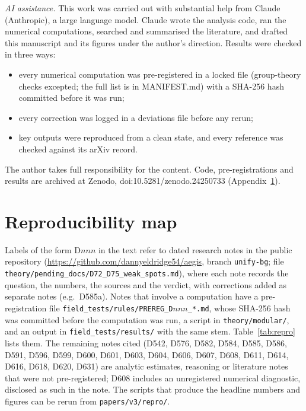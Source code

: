\documentclass[aps,prd,twocolumn,superscriptaddress,nofootinbib,floatfix]{revtex4-2}
\begin{document}
\begin{acknowledgments}
\textit{AI assistance.} This work was carried out with substantial help from Claude (Anthropic), a large language model. Claude wrote the analysis code, ran the numerical computations, searched and summarised the literature, and drafted this manuscript and its figures under the author's direction. Results were checked in three ways:
\begin{itemize}
\item every numerical computation was pre-registered in a locked file (group-theory checks excepted; the full list is in MANIFEST.md) with a SHA-256 hash committed before it was run;
\item every correction was logged in a deviations file before any rerun;
\item key outputs were reproduced from a clean state, and every reference was checked against its arXiv record.
\end{itemize}
The author takes full responsibility for the content. Code, pre-registrations and results are archived at Zenodo, doi:10.5281/zenodo.24250733 (Appendix~\ref{app:repro}).
\end{acknowledgments}

\appendix
\section{Reproducibility map}\label{app:repro}
Labels of the form D$nnn$ in the text refer to dated research notes in the public repository (\url{https://github.com/dannyeldridge54/aegis}, branch \texttt{unify-bg}; file \texttt{theory/pending\_docs/D72\_D75\_weak\_spots.md}), where each note records the question, the numbers, the sources and the verdict, with corrections added as separate notes (e.g.\ D585a). Notes that involve a computation have a pre-registration file \texttt{field\_tests/rules/PREREG\_D$nnn$\_*.md}, whose SHA-256 hash was committed before the computation was run, a script in \texttt{theory/modular/}, and an output in \texttt{field\_tests/results/} with the same stem. Table~\ref{tab:repro} lists them. The remaining notes cited (D542, D576, D582, D584, D585, D586, D591, D596, D599, D600, D601, D603, D604, D606, D607, D608, D611, D614, D616, D618, D620, D631) are analytic estimates, reasoning or literature notes that were not pre-registered; D608 includes an unregistered numerical diagnostic, disclosed as such in the note. The scripts that produce the headline numbers and figures can be rerun from \texttt{papers/v3/repro/}.
\end{document}
